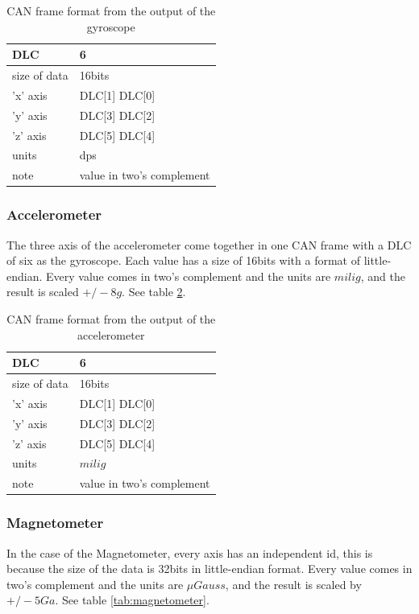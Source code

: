 \documentclass[12pt]{report}%
\begin{document}
\begin{table}[h!]
\centering
\begin{tabular}{|l|l|}
	\hline
	DLC						&	6													\\	\hline
	size of data	&	16bits										\\	\hline
	'x' axis			&	DLC[1] DLC[0]							\\	\hline
	'y'	axis			&	DLC[3] DLC[2]							\\	\hline
	'z'	axis			&	DLC[5] DLC[4]							\\	\hline
	units					&	dps												\\	\hline
	note					& value in two's complement \\	\hline
\end{tabular}
\caption{\label{tab:gyroscope} CAN frame format from the output of the gyroscope}
\end{table}

\subsubsection{Accelerometer}
The three axis of the accelerometer come together in one CAN frame with a DLC of six as the gyroscope. Each value has a size of 16bits with a format of little-endian. Every value comes in two's complement and the units are $mili g$, and the result is scaled $+/-8g$. See table \ref{tab:accelerometer}.

\begin{table}[h!]
\centering
\begin{tabular}{|l|l|}
	\hline
	DLC						&	6													\\	\hline
	size of data	&	16bits										\\	\hline
	'x' axis			&	DLC[1] DLC[0]							\\	\hline
	'y'	axis			&	DLC[3] DLC[2]							\\	\hline
	'z'	axis			&	DLC[5] DLC[4]							\\	\hline
	units					&	$mili g$									\\	\hline
	note					& value in two's complement \\	\hline
\end{tabular}
\caption{\label{tab:accelerometer} CAN frame format from the output of the accelerometer}
\end{table}

\subsubsection{Magnetometer}
In the case of the Magnetometer, every axis has an independent id, this is because the size of the data is 32bits in little-endian format. Every value comes in two's complement and the units are $\mu Gauss$, and the result is scaled by $+/-5Ga$. See table \ref{tab:magnetometer}.
\end{document}
